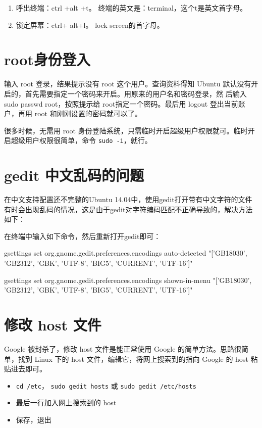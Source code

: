 {\begin{enumerate}
\item 呼出终端：ctrl +alt +t。 终端的英文是：terminal，这个t是英文首字母。

\item 锁定屏幕：ctrl+ alt+l。 lock screen的首字母。
\end{enumerate}



\section{root身份登入}
输入 root 登录，结果提示没有 root 这个用户。查询资料得知 Ubuntu 默认没有开启的，首先需要指定一个密码来开启。用原来的用户名和密码登录，然 后输入sudo passwd root，按照提示给 root指定一个密码。最后用 logout 登出当前账户，再用 root 和刚刚设置的密码就可以了。

很多时候，无需用 root 身份登陆系统，只需临时开启超级用户权限就可。临时开启超级用户权限很简单，命令 \verb*|sudo -i|，就行。



\section{gedit 中文乱码的问题}
在中文支持配置还不完整的Ubuntu 14.04中，使用gedit打开带有中文字符的文件有时会出现乱码的情况，这是由于gedit对字符编码匹配不正确导致的，解决方法如下：

在终端中输入如下命令，然后重新打开gedit即可：

    gsettings set org.gnome.gedit.preferences.encodings auto-detected "['GB18030', 'GB2312', 'GBK', 'UTF-8', 'BIG5', 'CURRENT', 'UTF-16']"

    gsettings set org.gnome.gedit.preferences.encodings shown-in-menu "['GB18030', 'GB2312', 'GBK', 'UTF-8', 'BIG5', 'CURRENT', 'UTF-16']"



\section{修改 host 文件}
Google 被封杀了，修改 host 文件是能正常使用 Google 的简单方法。思路很简单，找到 Linux 下的 host 文件，编辑它，将网上搜索到的指向 Google 的 host 粘贴进去即可。
\begin{itemize}
\item \verb*|cd /etc|， \verb*|sudo gedit hosts| 或 \verb*|sudo gedit /etc/hosts|
\item 最后一行加入网上搜索到的 host
\item 保存，退出
\end{itemize}



}
